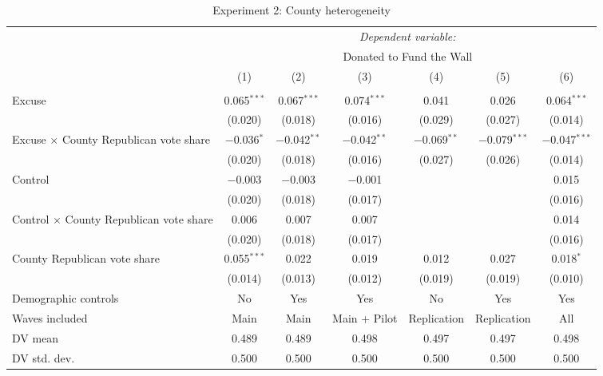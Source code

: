 
\begin{table}[!htbp] \centering 
  \caption{Experiment 2: County heterogeneity} 
  \label{t:2-cityheterogeneity} 
\begin{threeparttable}
\begin{tabular}{@{\hspace{5pt}}l@{\hspace{5pt}}cccccc} 
\toprule 
 & \multicolumn{6}{c}{\textit{Dependent variable:}} \\ 
\cmidrule(rr){2-7} 
 & \multicolumn{6}{c}{Donated to Fund the Wall} \\ 
 \cmidrule(rr){2-7}
 & (1) & (2) & (3) & (4) & (5) & (6)\\ 
\midrule  
\\[-2.1ex] Excuse & 0.065$^{***}$ & 0.067$^{***}$ & 0.074$^{***}$ & 0.041 & 0.026 & 0.064$^{***}$ \\ 
  & (0.020) & (0.018) & (0.016) & (0.029) & (0.027) & (0.014) \\ 
 \addlinespace 
 Excuse $\times$ County Republican vote share & $-$0.036$^{*}$ & $-$0.042$^{**}$ & $-$0.042$^{**}$ & $-$0.069$^{**}$ & $-$0.079$^{***}$ & $-$0.047$^{***}$ \\ 
  & (0.020) & (0.018) & (0.016) & (0.027) & (0.026) & (0.014) \\ 
 \addlinespace 
 Control & $-$0.003 & $-$0.003 & $-$0.001 &  &  & 0.015 \\ 
  & (0.020) & (0.018) & (0.017) &  &  & (0.016) \\ 
 \addlinespace 
 Control $\times$ County Republican vote share & 0.006 & 0.007 & 0.007 &  &  & 0.014 \\ 
  & (0.020) & (0.018) & (0.017) &  &  & (0.016) \\ 
 \addlinespace 
 County Republican vote share & 0.055$^{***}$ & 0.022 & 0.019 & 0.012 & 0.027 & 0.018$^{*}$ \\ 
  & (0.014) & (0.013) & (0.012) & (0.019) & (0.019) & (0.010) \\ 
 \addlinespace 
\midrule  
Demographic controls & No & Yes & Yes & No & Yes & Yes \\ 
Waves included & Main & Main & Main + Pilot & Replication & Replication & All \\ 
\midrule
DV mean & 0.489 & 0.489 & 0.498 & 0.497 & 0.497 & 0.498 \\
DV std. dev. & 0.500 & 0.500 & 0.500 & 0.500 & 0.500 & 0.500 \\

\end{tabular}
\end{threeparttable}
\end{table}

